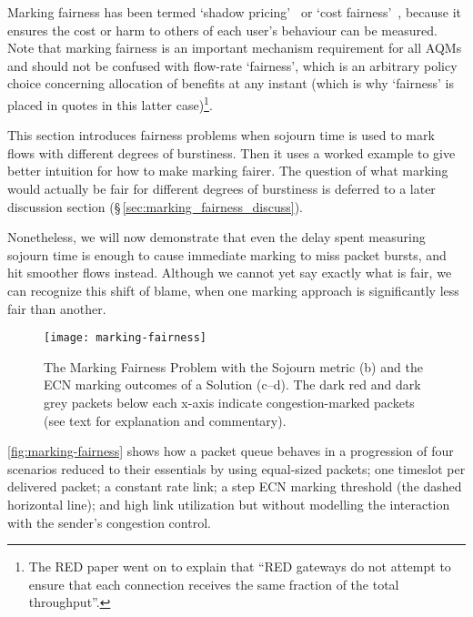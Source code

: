 Marking fairness has been termed `shadow pricing'~\cite{Kelly98:Shadow_prices_prop_fair} or `cost fairness'~\cite{Briscoe06g:Rate_fair_Dis}, because it ensures the cost or harm to others of each user's behaviour can be measured. Note that marking fairness is an important mechanism requirement for all AQMs and should not be confused with flow-rate `fairness', which is an arbitrary policy choice concerning allocation of benefits at any instant (which is why `fairness' is placed in quotes in this latter case)\footnote{The RED paper went on to explain that ``RED gateways do not attempt to ensure that each connection receives the same fraction of the total throughput''.}. 

This section introduces fairness problems when sojourn time is used to mark flows with different degrees of burstiness. Then it uses a worked example to give better intuition for how to make marking fairer. The question of what marking would actually be fair for different degrees of burstiness is deferred to a later discussion section (\S\,\ref{sec:marking_fairness_discuss}). 

Nonetheless, we will now demonstrate that even the delay spent measuring sojourn time is enough to cause immediate marking to miss packet bursts, and hit smoother flows instead. Although we cannot yet say exactly what is fair, we can recognize this shift of blame, when one marking approach is significantly less fair than another.

\begin{figure}[h]
	\centering
	\texttt{[image: marking-fairness]}
	\caption{The Marking Fairness Problem with the Sojourn metric (b) and the ECN marking outcomes of a Solution (c--d). The dark red and dark grey packets below each x-axis indicate congestion-marked packets (see text for explanation and commentary).}\label{fig:marking-fairness}
\end{figure}

\autoref{fig:marking-fairness} shows how a packet queue behaves in a progression of four scenarios reduced to their essentials by using equal-sized packets; one timeslot per delivered packet; a constant rate link; a step ECN marking threshold (the dashed horizontal line); and high link utilization but without modelling the interaction with the sender's congestion control. 

